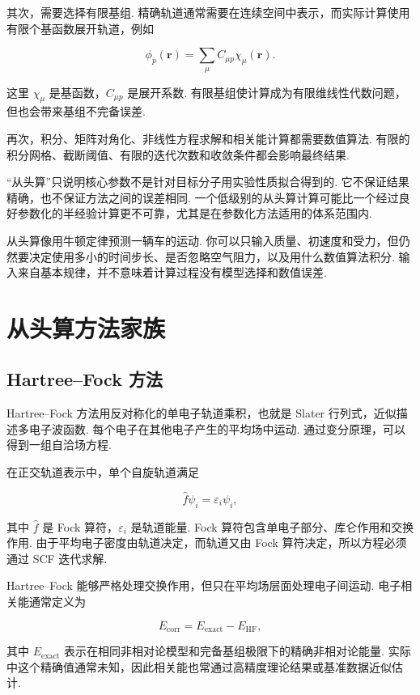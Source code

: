 \documentclass[UTF8,11pt,a4paper,openany]{ctexbook}
\begin{document}
其次，需要选择有限基组. 精确轨道通常需要在连续空间中表示，而实际计算使用有限个基函数展开轨道，例如

\[
\phi_p(\mathbf r)
=
\sum_\mu C_{\mu p}\chi_\mu(\mathbf r).
\]

这里 $\chi_\mu$ 是基函数，$C_{\mu p}$ 是展开系数. 有限基组使计算成为有限维线性代数问题，但也会带来基组不完备误差. 

再次，积分、矩阵对角化、非线性方程求解和相关能计算都需要数值算法. 有限的积分网格、截断阈值、有限的迭代次数和收敛条件都会影响最终结果. 

\begin{limitbox}
“从头算”只说明核心参数不是针对目标分子用实验性质拟合得到的. 它不保证结果精确，也不保证方法之间的误差相同. 一个低级别的从头算计算可能比一个经过良好参数化的半经验计算更不可靠，尤其是在参数化方法适用的体系范围内. 
\end{limitbox}

\begin{analogybox}
从头算像用牛顿定律预测一辆车的运动. 你可以只输入质量、初速度和受力，但仍然要决定使用多小的时间步长、是否忽略空气阻力，以及用什么数值算法积分. 输入来自基本规律，并不意味着计算过程没有模型选择和数值误差. 
\end{analogybox}

\section{从头算方法家族}

\subsection{Hartree--Fock 方法}

Hartree--Fock 方法用反对称化的单电子轨道乘积，也就是 Slater 行列式，近似描述多电子波函数. 每个电子在其他电子产生的平均场中运动. 通过变分原理，可以得到一组自洽场方程. 

在正交轨道表示中，单个自旋轨道满足

\[
\hat f\psi_i=\varepsilon_i\psi_i,
\]

其中 $\hat f$ 是 Fock 算符，$\varepsilon_i$ 是轨道能量. Fock 算符包含单电子部分、库仑作用和交换作用. 由于平均电子密度由轨道决定，而轨道又由 Fock 算符决定，所以方程必须通过 SCF 迭代求解. 

Hartree--Fock 能够严格处理交换作用，但只在平均场层面处理电子间运动. 电子相关能通常定义为

\[
E_{\mathrm{corr}}
=
E_{\mathrm{exact}}-E_{\mathrm{HF}},
\]

其中 $E_{\mathrm{exact}}$ 表示在相同非相对论模型和完备基组极限下的精确非相对论能量. 实际中这个精确值通常未知，因此相关能也常通过高精度理论结果或基准数据近似估计. 
\end{document}

